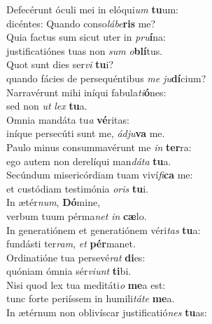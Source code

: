 \evenverse Defecérunt óculi mei in elóqui\textit{um} \textbf{tu}um:~\*\\
\evenverse dicéntes: Quando conso\textit{lá}\textit{be}\textbf{ris} me?\\
\oddverse Quia factus sum sicut uter in \textit{pru}\textbf{í}na:~\*\\
\oddverse justificatiónes tuas non \textit{sum} \textit{o}\textbf{blí}tus.\\
\evenverse Quot sunt dies ser\textit{vi} \textbf{tu}i?~\*\\
\evenverse quando fácies de persequéntibus \textit{me} \textit{ju}\textbf{dí}cium?\\
\oddverse Narravérunt mihi iníqui fabula\textit{ti}\textbf{ó}nes:~\*\\
\oddverse sed non \textit{ut} \textit{lex} \textbf{tu}a.\\
\evenverse Omnia mandáta tu\textit{a} \textbf{vé}ritas:~\*\\
\evenverse iníque persecúti sunt me, \textit{ád}\textit{ju}\textbf{va} me.\\
\oddverse Paulo minus consummavérunt me \textit{in} \textbf{ter}ra:~\*\\
\oddverse ego autem non derelíqui man\textit{dá}\textit{ta} \textbf{tu}a.\\
\evenverse Secúndum misericórdiam tuam viví\textit{fi}\textbf{ca} me:~\*\\
\evenverse et custódiam testimónia \textit{o}\textit{ris} \textbf{tu}i.\\
\oddverse In ætér\textit{num}, \textbf{Dó}mine,~\*\\
\oddverse verbum tuum pérma\textit{net} \textit{in} \textbf{cæ}lo.\\
\evenverse In generatiónem et generatiónem véri\textit{tas} \textbf{tu}a:~\*\\
\evenverse fundásti ter\textit{ram}, \textit{et} \textbf{pér}manet.\\
\oddverse Ordinatióne tua persevé\textit{rat} \textbf{di}es:~\*\\
\oddverse quóniam ómnia sér\textit{vi}\textit{unt} \textbf{ti}bi.\\
\evenverse Nisi quod lex tua meditáti\textit{o} \textbf{me}a est:~\*\\
\evenverse tunc forte periíssem in humili\textit{tá}\textit{te} \textbf{me}a.\\
\oddverse In ætérnum non oblivíscar justificatió\textit{nes} \textbf{tu}as:~\*\\
